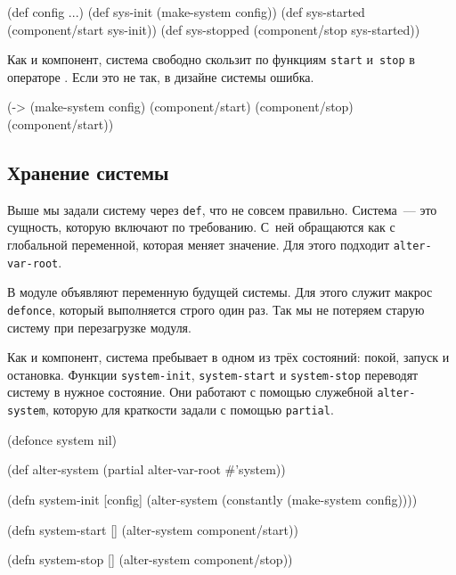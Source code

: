 \else

\begin{english}
  \begin{clojure}
(def config {...})
(def sys-init (make-system config))
(def sys-started (component/start sys-init))
(def sys-stopped (component/stop sys-started))
  \end{clojure}
\end{english}

\fi

Как и компонент, система свободно скользит по функциям \verb|start|
и~\verb|stop| в операторе \arr. Если это не так, в дизайне системы ошибка.

\begin{english}
  \begin{clojure}
(-> (make-system config)
    (component/start)
    (component/stop)
    (component/start))
  \end{clojure}
\end{english}

\subsection{Хранение системы}


Выше мы задали систему через \verb|def|, что не совсем правильно. Система~--- это
сущность, которую включают по требованию. С~ней обращаются как с глобальной
переменной, которая меняет значение. Для этого подходит \verb|alter-var-root|.

В модуле объявляют переменную будущей системы. Для этого служит макрос
\verb|defonce|, который выполняется строго один раз. Так мы не потеряем старую
систему при перезагрузке модуля.

Как и компонент, система пребывает в одном из трёх состояний: покой, запуск и
остановка. Функции \verb|system-init|, \verb|system-start| и \verb|system-stop|
переводят систему в нужное состояние. Они работают с помощью служебной
\verb|alter-system|, которую для краткости задали с помощью \verb|partial|.


\ifnarrow

\begin{english}
  \begin{clojure}
(defonce system nil)

(def alter-system
  (partial alter-var-root #'system))

(defn system-init [config]
  (alter-system
    (constantly (make-system config))))

(defn system-start []
  (alter-system component/start))

(defn system-stop []
  (alter-system component/stop))
  \end{clojure}
\end{english}

